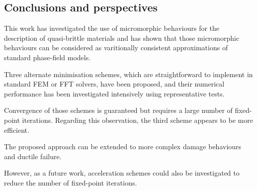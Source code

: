 \subsection{Conclusions and perspectives}

This work has investigated the use of micromorphic behaviours for the
description of quasi-brittle materials and has shown that those
micromorphic behaviours can be considered as varitionally consistent
approximations of standard phase-field models.

Three alternate minimisation schemes, which are straightforward to
implement in standard FEM or FFT solvers, have been proposed, and their numerical performance has been investigated intensively using representative tests. 

Convergence of those schemes is guaranteed but requires a large number
of fixed-point iterations. Regarding this observation, the third
scheme appears to be more efficient.

The proposed approach can be extended to more complex damage behaviours
and ductile failure.

However, as a future work, acceleration schemes could also be
investigated to reduce the number of fixed-point iterations.
